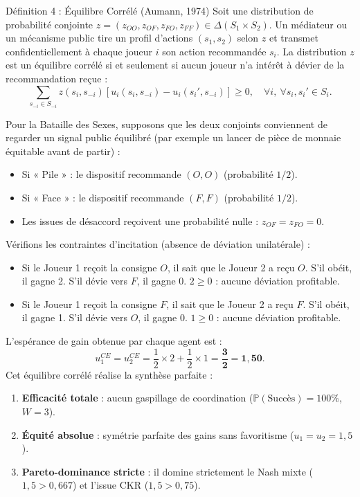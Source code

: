 \documentclass[11pt,a4paper]{article}
\begin{document}
\begin{propbox}{Définition 4 : Équilibre Corrélé (Aumann, 1974)}
Soit une distribution de probabilité conjointe $z = (z_{OO}, z_{OF}, z_{FO}, z_{FF}) \in \Delta(S_1 \times S_2)$. Un médiateur ou un mécanisme public tire un profil d'actions $(s_1, s_2)$ selon $z$ et transmet confidentiellement à chaque joueur $i$ son action recommandée $s_i$.
La distribution $z$ est un équilibre corrélé si et seulement si aucun joueur n'a intérêt à dévier de la recommandation reçue :
\begin{equation}
\sum_{s_{-i} \in S_{-i}} z(s_i, s_{-i}) \left[ u_i(s_i, s_{-i}) - u_i(s_i', s_{-i}) \right] \ge 0, \quad \forall i, \ \forall s_i, s_i' \in S_i.
\end{equation}
\end{propbox}

Pour la Bataille des Sexes, supposons que les deux conjoints conviennent de regarder un signal public équilibré (par exemple un lancer de pièce de monnaie équitable avant de partir) :
\begin{itemize}[leftmargin=1.5em]
    \item Si « Pile » : le dispositif recommande $(O, O)$ (probabilité $1/2$).
    \item Si « Face » : le dispositif recommande $(F, F)$ (probabilité $1/2$).
    \item Les issues de désaccord reçoivent une probabilité nulle : $z_{OF} = z_{FO} = 0$.
\end{itemize}

Vérifions les contraintes d'incitation (absence de déviation unilatérale) :
\begin{itemize}[leftmargin=1.5em]
    \item Si le Joueur 1 reçoit la consigne $O$, il sait que le Joueur 2 a reçu $O$. S'il obéit, il gagne 2. S'il dévie vers $F$, il gagne 0. $2 \ge 0$ : aucune déviation profitable.
    \item Si le Joueur 1 reçoit la consigne $F$, il sait que le Joueur 2 a reçu $F$. S'il obéit, il gagne 1. S'il dévie vers $O$, il gagne 0. $1 \ge 0$ : aucune déviation profitable.
\end{itemize}

L'espérance de gain obtenue par chaque agent est :
\begin{equation}
u_1^{CE} = u_2^{CE} = \frac{1}{2} \times 2 + \frac{1}{2} \times 1 = \mathbf{\frac{3}{2} = 1{,}50}.
\end{equation}
Cet équilibre corrélé réalise la synthèse parfaite :
\begin{enumerate}[label=(\roman*)]
    \item \textbf{Efficacité totale} : aucun gaspillage de coordination ($\mathbb{P}(\text{Succès}) = 100\%$, $W = 3$).
    \item \textbf{Équité absolue} : symétrie parfaite des gains sans favoritisme ($u_1 = u_2 = 1{,}5$).
    \item \textbf{Pareto-dominance stricte} : il domine strictement le Nash mixte ($1{,}5 > 0{,}667$) et l'issue CKR ($1{,}5 > 0{,}75$).
\end{enumerate}
\end{document}
